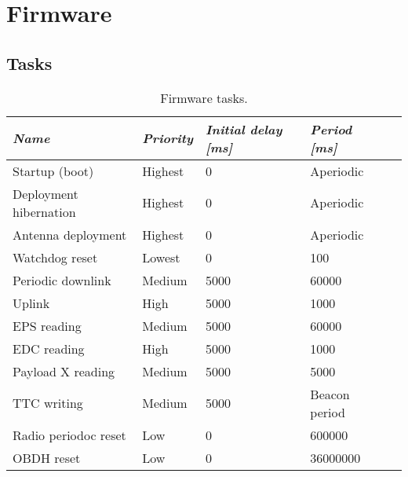 %
%
%
%
%

%
%
%
%
%
%

\chapter{Firmware} \label{ch:firmware}

\section{Tasks}

\begin{table}[!h]
    \centering
    \begin{tabular}{lllll}
        \toprule[1.5pt]
        \textit{Name}          & \textit{Priority} & \textit{Initial delay [ms]} & \textit{Period [ms]} \\
        \midrule
        Startup (boot)         & Highest           & 0                           & Aperiodic            \\
        Deployment hibernation & Highest           & 0                           & Aperiodic            \\
        Antenna deployment     & Highest           & 0                           & Aperiodic            \\
        Watchdog reset         & Lowest            & 0                           & 100                  \\
        Periodic downlink      & Medium            & 5000                        & 60000                \\
        Uplink                 & High              & 5000                        & 1000                 \\
        EPS reading            & Medium            & 5000                        & 60000                \\
        EDC reading            & High              & 5000                        & 1000                 \\
        Payload X reading      & Medium            & 5000                        & 5000                 \\
        TTC writing            & Medium            & 5000                        & Beacon period        \\
        Radio periodoc reset   & Low               & 0                           & 600000               \\
        OBDH reset             & Low               & 0                           & 36000000             \\
        \bottomrule[1.5pt]
    \end{tabular}
    \caption{Firmware tasks.}
    \label{tab:firmware-tasks}
\end{table}

